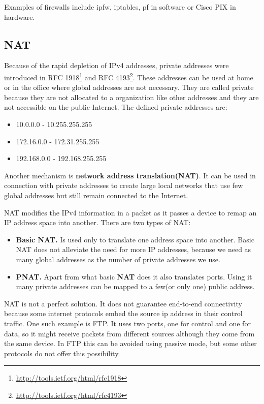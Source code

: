 Examples of firewalls include ipfw, iptables, pf in software or Cisco PIX in hardware.


\subsection{NAT}
\label{sub-sec:nat}

Because of the rapid depletion of IPv4 addresses, private addresses were introduced in 
RFC 1918\footnote{\url{http://tools.ietf.org/html/rfc1918}} and RFC 4193\footnote{\url{http://tools.ietf.org/html/rfc4193}}. 
These addresses can be used at home or in the office where global addresses are not necessary. They are called 
private because they are not allocated to a organization like other addresses and they are not accessible on the 
public Internet. The defined private addresses are:
\begin{itemize}
  \item 10.0.0.0 - 10.255.255.255
  \item 172.16.0.0 - 172.31.255.255
  \item 192.168.0.0 - 192.168.255.255
\end{itemize}

Another mechanism is \textbf{network address translation(NAT)}. It can be used in connection with private addresses to create
large local networks that use few global addresses but still remain connected to the Internet. 

NAT modifies the IPv4 information in a packet as it passes a device to remap an IP address space into another. There are two types of
NAT:
\begin{itemize}
  \item \textbf{Basic NAT.} Is used only to translate one address space into another. Basic NAT does not alleviate the need
for more IP addresses, because we need as many global addresses as the number of private addresses we use.
  \item \textbf{PNAT.} Apart from what basic \textbf{NAT} does it also translates ports. Using it many private addresses can be mapped
to a few(or only one) public address.
\end{itemize}


NAT is not a perfect solution. It does not guarantee end-to-end connectivity because some internet protocols embed the source
ip address in their control traffic. One such example is FTP. It uses two ports, one for control and one for data, so it might receive
packets from different sources although they come from the same device. In FTP this can be avoided using passive mode, but some other 
protocols do not offer this possibility.

